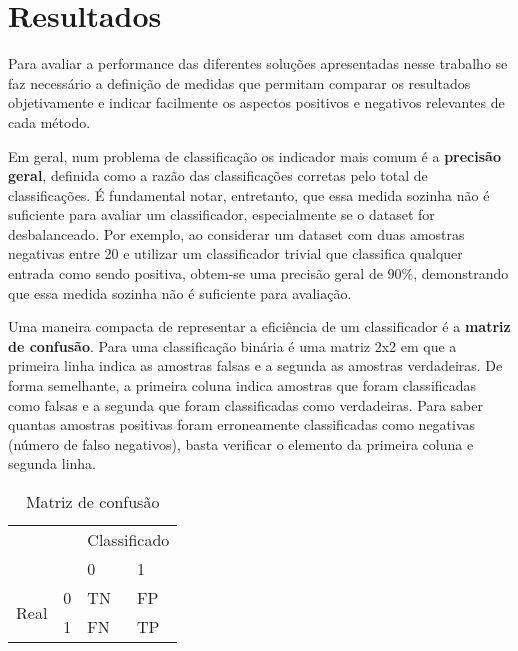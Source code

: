 \chapter{Resultados}

Para avaliar a performance das diferentes soluções apresentadas nesse trabalho se faz necessário a definição de medidas que permitam comparar os resultados objetivamente e indicar facilmente os aspectos positivos e negativos relevantes de cada método.

Em geral, num problema de classificação os indicador mais comum é a \textbf{precisão geral}, definida como a razão das classificações corretas pelo total de classificações. É fundamental notar, entretanto, que essa medida sozinha não é suficiente para avaliar um classificador, especialmente se o dataset for desbalanceado. Por exemplo, ao considerar um dataset com duas amostras negativas entre 20 e utilizar um classificador trivial que classifica qualquer entrada como sendo positiva, obtem-se uma precisão geral de 90\%, demonstrando que essa medida sozinha não é suficiente para avaliação.

Uma maneira compacta de representar a eficiência de um classificador é a \textbf{matriz de confusão}. Para uma classificação binária é uma matriz 2x2 em que a primeira linha indica as amostras falsas e a segunda as amostras verdadeiras. De forma semelhante, a primeira coluna indica amostras que foram classificadas como falsas e a segunda que foram classificadas como verdadeiras. Para saber quantas amostras positivas foram erroneamente classificadas como negativas (número de falso negativos), basta verificar o elemento da primeira coluna e segunda linha.

\begin{table}[h]
\centering
\caption{Matriz de confusão}
\label{tab:matriz-confusão}
\begin{tabular}{ll|l|l|}
\cline{3-4}
                                            &   & \multicolumn{2}{l|}{Classificado} \\ \cline{3-4} 
                                            &   & 0               & 1               \\ \hline
\multicolumn{1}{|l|}{\multirow{2}{*}{Real}} & 0 & TN              & FP              \\ \cline{2-4} 
\multicolumn{1}{|l|}{}                      & 1 & FN              & TP              \\ \hline
\end{tabular}
\end{table}

